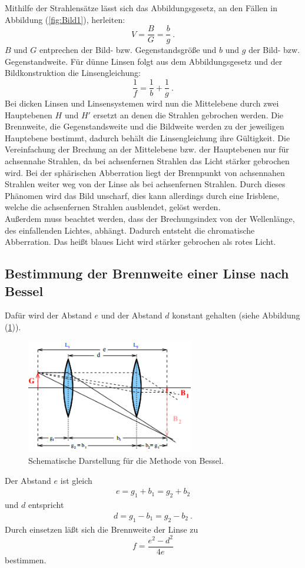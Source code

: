 Mithilfe der Strahlensätze lässt sich das Abbildungsgesetz, an den Fällen in \\ Abbildung (\ref{fig:Bild1}), herleiten:
\begin{equation}
	V = \frac{B}{G} = \frac{b}{g} \ .
	\label{eqn:V}
\end{equation}
$B$ und $G$ entprechen der Bild- bzw. Gegenstandsgröße und $b$ und $g$ der Bild- bzw. Gegenstandweite. Für dünne Linsen folgt aus dem Abbildungsgesetz und der Bildkonstruktion die Linsengleichung:
\begin{equation}
	\frac{1}{f} = \frac{1}{b} + \frac{1}{g} \ .
	\label{eqn:D}
\end{equation}
Bei dicken Linsen und Linsensystemen wird nun die Mittelebene durch zwei Hauptebenen $H$ und $H'$ ersetzt an denen die Strahlen gebrochen werden. Die Brennweite, die Gegenstandsweite und die Bildweite werden zu der jeweiligen Hauptebene bestimmt, dadurch behält die Linsengleichung ihre Gültigkeit. Die Vereinfachung der Brechung an der Mittelebene bzw. der Hauptebenen nur für achsennahe Strahlen, da bei achsenfernen Strahlen das Licht stärker gebrochen wird. Bei der sphärischen Abberration liegt der Brennpunkt von achsennahen Strahlen weiter weg von der Linse als bei achsenfernen Strahlen. Durch dieses Phänomen wird das Bild unscharf, dies kann allerdings durch eine Irisblene, welche die achsenfernen Strahlen ausblendet, gelöst werden. \\
Außerdem muss beachtet werden, dass der Brechungsindex von der Wellenlänge, des einfallenden Lichtes, abhängt. Dadurch entsteht die chromatische Abberration. Das heißt blaues Licht wird stärker gebrochen als rotes Licht.

\subsection{Bestimmung der Brennweite einer Linse nach Bessel}
Dafür wird der Abstand $e$ und der Abstand $d$ konstant gehalten (siehe Abbildung (\ref{fig:Bessel})).
\begin{figure}[H]
	\centering
	\includegraphics[height=5cm]{picture/Bessel}
	\caption{Schematische Darstellung für die Methode von Bessel.}
	\label{fig:Bessel}
\end{figure}
Der Abstand $e$ ist gleich
\begin{align*}
	e = g_1 + b_1 = g_2 + b_2
\end{align*}
und $d$ entspricht
\begin{align*}
	d = g_1 - b_1 = g_2 - b_2 \ .
\end{align*}
Durch einsetzen läßt sich die Brennweite der Linse zu
\begin{equation}
	f = \frac{e^2 - d^2}{4e}
\end{equation}
bestimmen.

